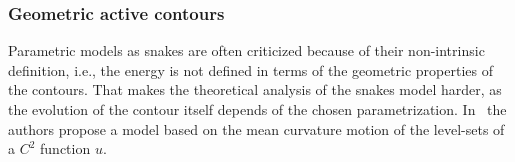 










\subsubsection{Geometric active contours}
Parametric models as snakes are often criticized because of their non-intrinsic definition, i.e., the energy is not defined in terms of the geometric properties of the contours. That makes the theoretical analysis of the snakes model harder, as the evolution of the contour itself depends of the chosen parametrization. In~\cite{caselles93} the authors propose a model based on the mean curvature motion of the level-sets of a $C^2$ function $u$.


